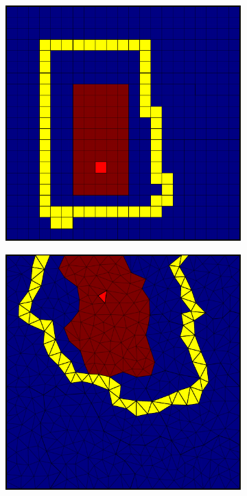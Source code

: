 \begin{figure}[htbp]
\begin{subfigure}[t]{0.3\textwidth}
  \end{subfigure}
  \hfill
  \begin{subfigure}[t]{0.3\textwidth}
    \centerline{\includegraphics[width=0.9\linewidth]{figs/square_cart_metis_cell_init}}
  \end{subfigure}
  \hfill
  \begin{subfigure}[t]{0.3\textwidth}
    \centerline{\includegraphics[width=0.9\linewidth]{figs/square_tria_metis_cell_init}}

\end{subfigure}
\end{figure}
